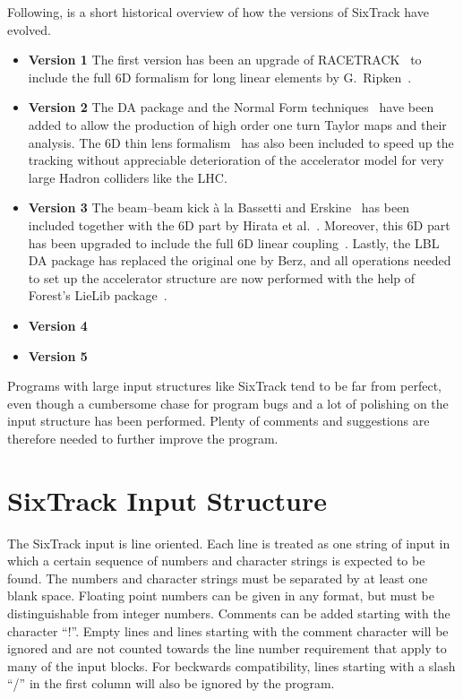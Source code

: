 Following, is a short historical overview of how the versions of SixTrack have evolved.
\begin{itemize}
    \item \textbf{Version 1}
        The first version has been an upgrade of RACETRACK~\cite{RACETRACK} to include the full 6D formalism for long linear elements by G.~Ripken~\cite{Ripken85}.
    \item \textbf{Version 2}
        The DA package and the Normal Form techniques~\cite{Berz89,Forest89} have been added to allow the production of high order one turn Taylor maps and their analysis.
        The 6D thin lens formalism~\cite{Ripken95} has also been included to speed up the tracking without appreciable deterioration of the accelerator model for very large Hadron colliders like the LHC.
    \item \textbf{Version 3}
        The beam--beam kick \`a la Bassetti and Erskine~\cite{BasErs} has been included together with the 6D part by Hirata et al.~\cite{Hirata}.
        Moreover, this 6D part has been upgraded to include the full 6D linear coupling~\cite{ripbeam}.
        Lastly, the LBL DA package has replaced the original one by Berz, and all operations needed to set up the accelerator structure are now performed with the help of Forest's LieLib package~\cite{DALIE}.
    \item \textbf{Version 4}
    \item \textbf{Version 5}
\end{itemize}

Programs with large input structures like SixTrack tend to be far from perfect, even though a cumbersome chase for program bugs and a lot of polishing on the input structure has been performed.
Plenty of comments and suggestions are therefore needed to further improve the program.

\section{SixTrack Input Structure}

The SixTrack input is line oriented.
Each line is treated as one string of input in which a certain sequence of numbers and character strings is expected to be found.
The numbers and character strings must be separated by at least one blank space.
Floating point numbers can be given in any format, but must be distinguishable from integer numbers.
Comments can be added starting with the character ``!''.
Empty lines and lines starting with the comment character will be ignored and are not counted towards the line number requirement that apply to many of the input blocks.
For beckwards compatibility, lines starting with a slash ``/'' in the first column will also be ignored by the program.

